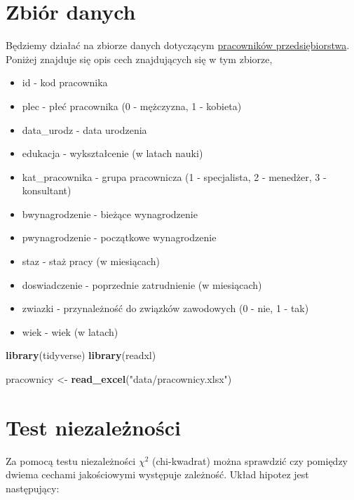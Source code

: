 \documentclass[]{book}
\newenvironment{Shaded}{\begin{snugshade}}{\end{snugshade}}
\newcommand{\KeywordTok}[1]{\textcolor[rgb]{0.13,0.29,0.53}{\textbf{#1}}}
\newcommand{\NormalTok}[1]{#1}
\newcommand{\StringTok}[1]{\textcolor[rgb]{0.31,0.60,0.02}{#1}}
\providecommand{\tightlist}{%
  \setlength{\itemsep}{0pt}\setlength{\parskip}{0pt}}
\begin{document}
\hypertarget{zbior-danych}{%
\section{Zbiór danych}\label{zbior-danych}}

Będziemy działać na zbiorze danych dotyczącym \href{data/pracownicy.xlsx}{pracowników przedsiębiorstwa}. Poniżej znajduje się opis cech znajdujących się w tym zbiorze,

\begin{itemize}
\tightlist
\item
  id - kod pracownika
\item
  plec - płeć pracownika (0 - mężczyzna, 1 - kobieta)
\item
  data\_urodz - data urodzenia
\item
  edukacja - wykształcenie (w latach nauki)
\item
  kat\_pracownika - grupa pracownicza (1 - specjalista, 2 - menedżer, 3 - konsultant)
\item
  bwynagrodzenie - bieżące wynagrodzenie
\item
  pwynagrodzenie - początkowe wynagrodzenie
\item
  staz - staż pracy (w miesiącach)
\item
  doswiadczenie - poprzednie zatrudnienie (w miesiącach)
\item
  zwiazki - przynależność do związków zawodowych (0 - nie, 1 - tak)
\item
  wiek - wiek (w latach)
\end{itemize}

\begin{Shaded}
\begin{Highlighting}[]
\KeywordTok{library}\NormalTok{(tidyverse)}
\KeywordTok{library}\NormalTok{(readxl)}

\NormalTok{pracownicy <-}\StringTok{ }\KeywordTok{read_excel}\NormalTok{(}\StringTok{"data/pracownicy.xlsx"}\NormalTok{)}
\end{Highlighting}
\end{Shaded}

\hypertarget{test-niezaleznosci}{%
\section{Test niezależności}\label{test-niezaleznosci}}

Za pomocą testu niezależności \(\chi^2\) (chi-kwadrat) można sprawdzić czy pomiędzy dwiema cechami jakościowymi występuje zależność. Układ hipotez jest następujący:
\end{document}
